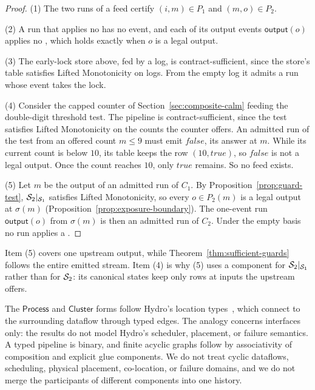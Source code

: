 \begin{proof}
(1) The two runs of a feed certify $(i,m)\in P_1$ and $(m,o)\in P_2$.

(2) A run that applies no \commitment has no \commitment event, and each of its
output events $\mathsf{output}(o)$ applies no \commitment, which holds exactly
when $o$ is a legal output.

(3) The early-lock store above, fed by a log, is contract-sufficient, since the
store's table satisfies Lifted Monotonicity on logs.  From the empty log it
admits a run whose \commitment event takes the lock.

(4) Consider the capped counter of Section~\ref{sec:composite-calm} feeding
the double-digit threshold test.  The pipeline is contract-sufficient, since the
test satisfies Lifted Monotonicity on the counts the counter offers.  An
admitted run of the test from an offered count $m\le 9$ must emit
$\mathit{false}$, its answer at $m$.  While its current count is below $10$,
its table keeps the row $(10,\mathit{true})$, so $\mathit{false}$ is not a
legal output.  Once the count reaches $10$, only $\mathit{true}$ remains.  So
no feed exists.

(5) Let $m$ be the output of an admitted run of $C_1$.  By Proposition~\ref{prop:guard-test}, $\mathcal{S}_2|_{\mathcal{S}_1}$ satisfies
Lifted Monotonicity, so every $o\in P_2(m)$ is a legal output at $\sigma(m)$
(Proposition~\ref{prop:exposure-boundary}).  The one-event run
$\mathsf{output}(o)$ from $\sigma(m)$ is then an admitted run of $C_2$.
Under the empty basis no run applies a \commitment.
\end{proof}

Item (5) covers one upstream output, while
Theorem~\ref{thm:sufficient-guards} follows the entire emitted stream.
Item (4) is why (5) uses a component for $\mathcal{S}_2|_{\mathcal{S}_1}$ rather than for
$\mathcal{S}_2$: its canonical states keep only rows at inputs the upstream offers.

The $\mathsf{Process}$ and $\mathsf{Cluster}$ forms follow Hydro's location
types~\cite{hydro}, which connect to the surrounding dataflow through typed
edges.  The analogy concerns interfaces only: the results do not model
Hydro's scheduler, placement, or failure semantics.  A typed pipeline is
binary, and finite acyclic graphs follow by associativity of composition and
explicit glue components.  We do not treat cyclic dataflows, scheduling,
physical placement, co-location, or failure domains, and we do not merge the
participants of different components into one history.
